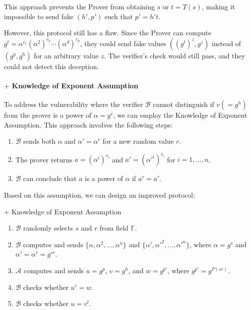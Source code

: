 \documentclass{article}
\begin{document}
This approach prevents the Prover from obtaining $s$ or $t = T(s)$, making it impossible to send fake $(h', p')$ such that $p' = h't$.

However, this protocol still has a flaw. Since the Prover can compute $g^t = \alpha^{c_1}(\alpha^2)^{c_2}\cdots(\alpha^d)^{c_d}$, they could send fake values $((g^{t})^{z}, g^{z})$ instead of $(g^p, g^h)$ for an arbitrary value $z$. The verifier's check would still pass, and they could not detect this deception.

\paragraph{$+$ Knowledge of Exponent Assumption}

To address the vulnerability where the verifier $\mathcal{B}$ cannot distinguish if $v (= g^h)$ from the prover is a power of $\alpha = g^s$, we can employ the Knowledge of Exponent Assumption. This approach involves the following steps:

\begin{enumerate}
    \item $\mathcal{B}$ sends both $\alpha$ and $\alpha' = \alpha^r$ for a new random value $r$.
    \item The prover returns $a = (\alpha^i)^{c_i}$ and $a' = (\alpha'^i)^{c_i}$ for $i = 1, ..., n$.
    \item $\mathcal{B}$ can conclude that $a$ is a power of $\alpha$ if $a^r = a'$.
\end{enumerate}

Based on this assumption, we can design an improved protocol:

\begin{protocol}{$+$ Knowledge of Exponent Assumption}{}
\begin{enumerate}
    \item $\mathcal{B}$ randomly selects $s$ and $r$ from field $\mathbb{F}$.
    \item $\mathcal{B}$ computes and sends $\{\alpha, \alpha^2, ..., \alpha^{n}\}$ and $\{\alpha', \alpha'^2, ..., \alpha'^{n}\}$, where $\alpha = g^{s}$ and $\alpha' = \alpha^{r} = g^{sr}$.
    \item $\mathcal{A}$ computes and sends $u = g^{p}$, $v = g^{h}$, and $w = g^{p'}$, where $g^{p'} = g^{P(sr)}$.
    \item $\mathcal{B}$ checks whether $u^{r} = w$.
    \item $\mathcal{B}$ checks whether $u = v^{t}$.
\end{enumerate}
\end{protocol}
\end{document}
